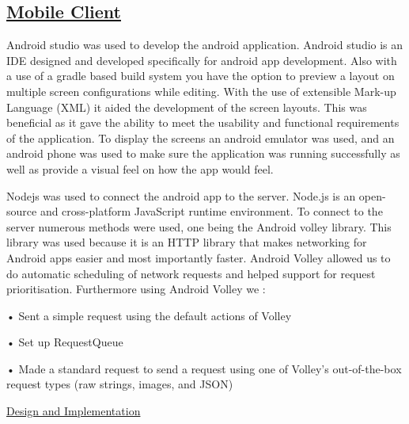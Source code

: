 \documentclass{article}
\begin{document}
\subsection{\underline{Mobile Client}}
Android studio was used to develop the android application. Android studio is an IDE designed and developed specifically for android app development. Also with a use of a gradle based build system you have the option to preview a layout on multiple screen configurations while editing. With the use of extensible Mark-up Language (XML) it aided the development of the screen layouts. This was beneficial as it gave the ability to meet the usability and functional requirements of the application. To display the screens an android emulator was used, and an android phone was used to make sure the application was running successfully as well as provide a visual feel on how the app would feel.

Nodejs was used to connect the android app to the server. Node.js is an open-source and cross-platform JavaScript runtime environment. To connect to the server numerous methods were used, one being the Android volley library. This library was used because it is an HTTP library that makes networking for Android apps easier and most importantly faster. Android Volley allowed us to do automatic scheduling of network requests and helped support for request prioritisation.  Furthermore using Android Volley we :

•	Sent a simple request using the default actions of Volley

•	Set up RequestQueue

•	Made a standard request to send a request using one of Volley's out-of-the-box request types (raw strings, images, and JSON)


\underline{Design and Implementation}
\end{document}
